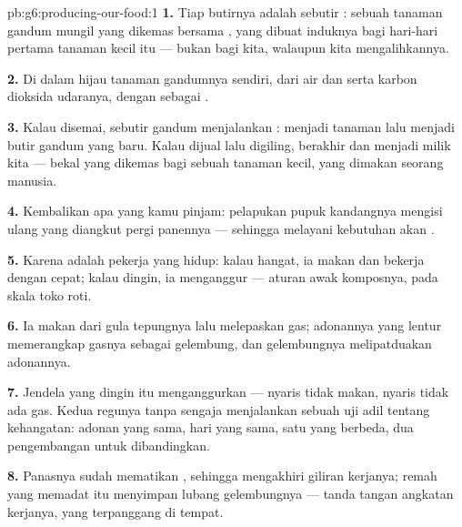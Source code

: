 \begin{solution}{pb:g6:producing-our-food:1}
\textbf{1.} Tiap butirnya adalah sebutir : sebuah tanaman gandum
mungil yang dikemas bersama , yang dibuat induknya bagi
hari-hari pertama tanaman kecil itu --- bukan bagi kita, walaupun kita
mengalihkannya.

\textbf{2.} Di dalam  hijau tanaman gandumnya sendiri, dari air
dan   serta karbon dioksida udaranya, dengan
 sebagai .

\textbf{3.} Kalau disemai, sebutir gandum menjalankan :
 menjadi tanaman lalu menjadi butir gandum yang baru.
Kalau dijual lalu digiling,  berakhir dan  menjadi milik kita --- bekal yang dikemas bagi sebuah
tanaman kecil, yang dimakan seorang manusia.

\textbf{4.} Kembalikan apa yang kamu pinjam: pelapukan pupuk kandangnya
mengisi ulang  yang diangkut pergi panennya --- sehingga
melayani kebutuhan akan .

\textbf{5.} Karena  adalah pekerja yang hidup: kalau hangat, ia
makan dan bekerja dengan cepat; kalau dingin, ia menganggur --- aturan
awak komposnya, pada skala toko roti.

\textbf{6.} Ia makan dari gula tepungnya lalu melepaskan gas;
adonannya yang lentur memerangkap gasnya sebagai gelembung, dan
gelembungnya melipatduakan adonannya.

\textbf{7.} Jendela yang dingin itu menganggurkan  --- nyaris
tidak makan, nyaris tidak ada gas. Kedua regunya tanpa sengaja
menjalankan sebuah uji adil tentang kehangatan: adonan yang sama, hari
yang sama, satu  yang berbeda, dua pengembangan untuk
dibandingkan.

\textbf{8.} Panasnya sudah mematikan , sehingga mengakhiri
giliran kerjanya; remah yang memadat itu menyimpan lubang
gelembungnya --- tanda tangan angkatan kerjanya, yang terpanggang di
tempat.


\end{solution}
